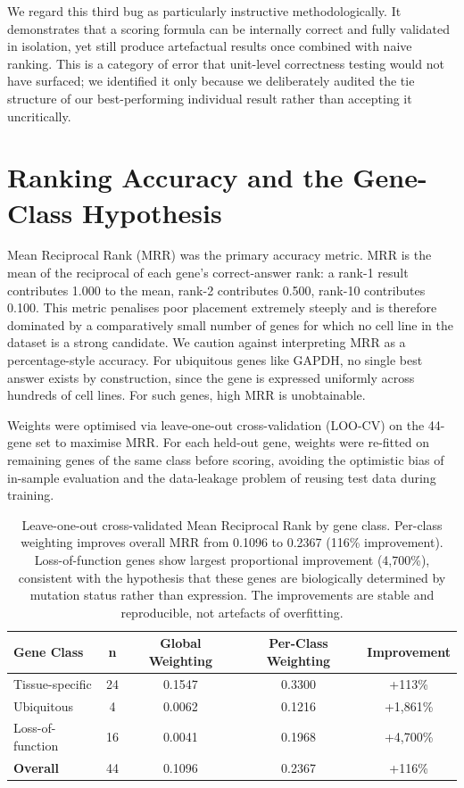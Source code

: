 \documentclass[author={Karen Coutinho, Ishaan Bhalla, Aman Raj, Dixit Kaloorani Malarmannan},
                supervisor={Dr. Daniel D'Andrea},
                degree={MSc},
                title={CellSelector Omics: A Multi-Omics Recommendation System for Cell Line Selection},
                subtitle={},
                type={},
                year={2026}]{dissertation}
\begin{document}
We regard this third bug as particularly instructive methodologically. It demonstrates that a scoring formula can be internally correct and fully validated in isolation, yet still produce artefactual results once combined with naive ranking. This is a category of error that unit-level correctness testing would not have surfaced; we identified it only because we deliberately audited the tie structure of our best-performing individual result rather than accepting it uncritically.

\section{Ranking Accuracy and the Gene-Class Hypothesis}

Mean Reciprocal Rank (MRR) was the primary accuracy metric. MRR is the mean of the reciprocal of each gene's correct-answer rank: a rank-1 result contributes 1.000 to the mean, rank-2 contributes 0.500, rank-10 contributes 0.100. This metric penalises poor placement extremely steeply and is therefore dominated by a comparatively small number of genes for which no cell line in the dataset is a strong candidate. We caution against interpreting MRR as a percentage-style accuracy. For ubiquitous genes like GAPDH, no single best answer exists by construction, since the gene is expressed uniformly across hundreds of cell lines. For such genes, high MRR is unobtainable.

Weights were optimised via leave-one-out cross-validation (LOO-CV) on the 44-gene set to maximise MRR. For each held-out gene, weights were re-fitted on remaining genes of the same class before scoring, avoiding the optimistic bias of in-sample evaluation and the data-leakage problem of reusing test data during training.

\begin{table}[t]
\centering
\begin{tabular}{|l|c|c|c|c|}
\hline
{\bf Gene Class} & {\bf n} & {\bf Global Weighting} & {\bf Per-Class Weighting} & {\bf Improvement} \\
\hline
Tissue-specific & 24 & 0.1547 & 0.3300 & +113\% \\
Ubiquitous & 4 & 0.0062 & 0.1216 & +1,861\% \\
Loss-of-function & 16 & 0.0041 & 0.1968 & +4,700\% \\
\hline
{\bf Overall} & 44 & 0.1096 & 0.2367 & +116\% \\
\hline
\end{tabular}
\caption{Leave-one-out cross-validated Mean Reciprocal Rank by gene class. Per-class weighting improves overall MRR from 0.1096 to 0.2367 (116\% improvement). Loss-of-function genes show largest proportional improvement (4,700\%), consistent with the hypothesis that these genes are biologically determined by mutation status rather than expression. The improvements are stable and reproducible, not artefacts of overfitting.}
\label{tab:mrr-by-class}
\end{table}
\end{document}
